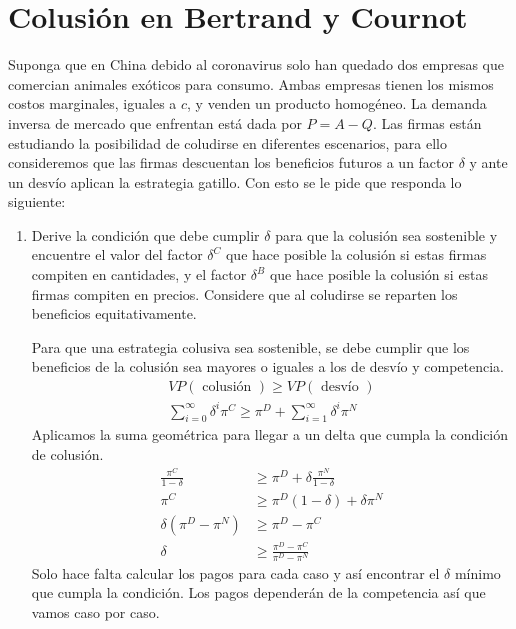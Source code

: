 \section{Colusión en Bertrand y Cournot}
Suponga que en China debido al coronavirus solo han quedado dos empresas que comercian animales exóticos para consumo. Ambas empresas tienen los mismos costos marginales, iguales a $c$, y venden un producto homogéneo. La demanda inversa de mercado que enfrentan está dada por $P=A-Q$. Las firmas están estudiando la posibilidad de coludirse en diferentes escenarios, para ello consideremos que las firmas descuentan los beneficios futuros a un factor $\delta$ y ante un desvío aplican la estrategia gatillo. Con esto se le pide que responda lo siguiente:

\begin{enumerate}
  \item Derive la condición que debe cumplir $\delta$ para que la colusión sea sostenible y encuentre el valor del factor $\delta^{C}$ que hace posible la colusión si estas firmas compiten en cantidades, y el factor $\delta^{B}$ que hace posible la colusión si estas firmas compiten en precios. Considere que al coludirse se reparten los beneficios equitativamente.
  \begin{solution}
    Para que una estrategia colusiva sea sostenible, se debe cumplir que los beneficios de la colusión sea mayores o iguales a los de desvío y competencia.
    \begin{align*}
        VP(\text { colusión }) \geq VP(\text { desvío }) \\
        \sum_{i=0}^{\infty} \delta^{i} \pi^{C} \geq \pi^{D}+\sum_{i=1}^{\infty} \delta^{i} \pi^{N}
    \end{align*}
    Aplicamos la suma geométrica para llegar a un delta que cumpla la condición de colusión.
    \begin{align*}
        \frac{\pi^{C}}{1-\delta} &\geq \pi^{D}+\delta \frac{\pi^{N}}{1-\delta} \\
        \pi^{C} &\geq \pi^{D}(1-\delta)+\delta \pi^{N} \\
        \delta\left(\pi^{D}-\pi^{N}\right) &\geq \pi^{D}-\pi^{C} \\
        \delta &\geq \frac{\pi^{D}-\pi^{C}}{\pi^{D}-\pi^{N}}
    \end{align*}
    Solo hace falta calcular los pagos para cada caso y así encontrar el $\delta$ mínimo que cumpla la condición. Los pagos dependerán de la competencia así que vamos caso por caso.


\end{solution}
\end{enumerate}
